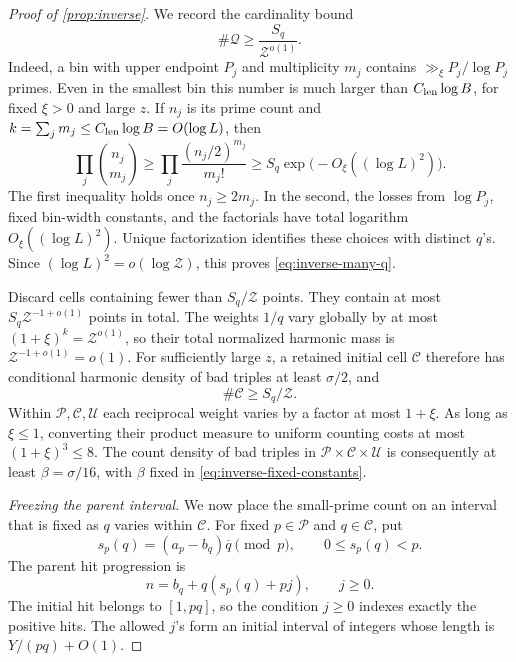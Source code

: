 \begin{proof}[Proof of \cref{prop:inverse}]
We record the cardinality bound
\begin{equation}
 \#\mathcal Q\ge \frac{S_q}{\mathcal Z^{o(1)}}.
 \label{eq:inverse-many-q}
\end{equation}
Indeed, a bin with upper endpoint \(P_j\) and multiplicity \(m_j\)
contains \(\gg_\xi P_j/\log P_j\) primes.  Even in the smallest bin
this number is much larger than \(C_{\rm len}\log B\), for fixed
\(\xi>0\) and large \(z\).
If \(n_j\) is its prime count and
\(k=\sum_jm_j\le C_{\rm len}\log B=O(\log L)\), then
\[
 \prod_j\binom{n_j}{m_j}
 \ge \prod_j\frac{(n_j/2)^{m_j}}{m_j!}
 \ge S_q\exp\!\bigl(-O_\xi((\log L)^2)\bigr).
\]
The first inequality holds once \(n_j\ge2m_j\).
In the second, the losses from \(\log P_j\), fixed bin-width constants,
and the factorials have total logarithm \(O_\xi((\log L)^2)\).
Unique factorization identifies these choices with distinct \(q\)'s.
Since \((\log L)^2=o(\log\mathcal Z)\), this proves
\eqref{eq:inverse-many-q}.

Discard cells containing fewer than \(S_q/\mathcal Z\) points.
They contain at most \(S_q\mathcal Z^{-1+o(1)}\) points in total.
The weights \(1/q\) vary globally by at most
\((1+\xi)^k=\mathcal Z^{o(1)}\), so their total normalized harmonic
mass is \(\mathcal Z^{-1+o(1)}=o(1)\).
For sufficiently large \(z\), a retained initial cell \(\mathcal C\)
therefore has conditional harmonic density of bad triples at least
\(\sigma/2\), and
\begin{equation}
 \#\mathcal C\ge S_q/\mathcal Z.
 \label{eq:inverse-cell-size}
\end{equation}
Within \(\mathcal P,\mathcal C,\mathcal U\) each reciprocal weight
varies by a factor at most \(1+\xi\).
As long as \(\xi\le1\), converting their product measure to uniform
counting costs at most \((1+\xi)^3\le8\).
The count density of bad triples in
\(\mathcal P\times\mathcal C\times\mathcal U\) is consequently at least
\(\beta=\sigma/16\), with \(\beta\) fixed in
\eqref{eq:inverse-fixed-constants}.

\medskip
\emph{Freezing the parent interval.}
We now place the small-prime count on an interval that is fixed as
\(q\) varies within \(\mathcal C\).
For fixed \(p\in\mathcal P\) and \(q\in\mathcal C\), put
\begin{equation}
 s_p(q)=(a_p-b_q)\overline q\pmod p,
 \qquad 0\le s_p(q)<p.
 \label{eq:inverse-s}
\end{equation}
The parent hit progression is
\[
 n=b_q+q(s_p(q)+pj),\qquad j\ge0.
\]
The initial hit belongs to \([1,pq]\), so the condition \(j\ge0\)
indexes exactly the positive hits.
The allowed \(j\)'s form an initial interval of integers whose length
is \(Y/(pq)+O(1)\).


\end{proof}
